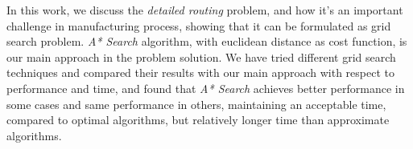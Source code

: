 In this work, we discuss the \emph{detailed routing} problem, and how it's an important challenge in manufacturing process, showing that it can be formulated as grid search problem.
\emph{A* Search} algorithm, with euclidean distance as cost function, is our main approach in the problem solution.
We have tried different grid search techniques and compared their results with our main approach with respect to performance and time, and found that
\emph{A* Search} achieves better performance in some cases and same performance in others, maintaining an acceptable time, compared to optimal algorithms, but relatively longer time than approximate algorithms.